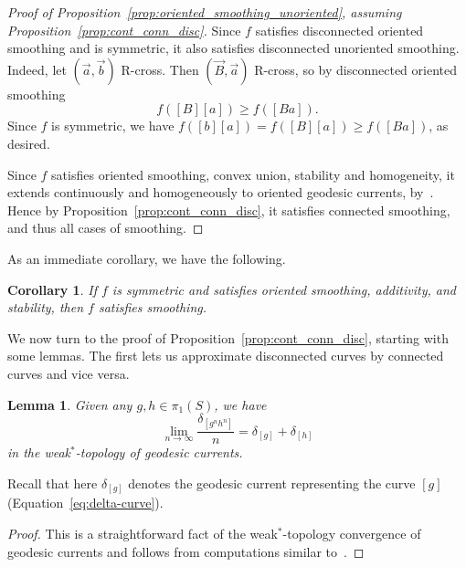 \documentclass[11pt]{amsart}
\newcommand{\ora}[1]{\overrightarrow{#1}}
\numberwithin{equation}{section}
\numberwithin{figure}{section}
\newtheorem{lemma}[theorem]{Lemma}
\newtheorem{corollary}[theorem]{Corollary}
\theoremstyle{definition}
\theoremstyle{plain}
\begin{document}
\begin{proof}[Proof of
  Proposition~\ref{prop:oriented_smoothing_unoriented}, assuming Proposition~\ref{prop:cont_conn_disc}]
  Since $f$ satisfies disconnected oriented smoothing and is
  symmetric, it also
  satisfies disconnected unoriented smoothing. Indeed, let
  $(\ora{a},\ora{b})$ R-cross. Then $(\ora{B},\ora{a})$ R-cross, so by
  disconnected oriented smoothing
\[
f([B][a]) \geq f([Ba]).
\]
Since $f$ is symmetric, we have $f([b][a])=f([B][a]) \geq
f([Ba])$, as desired.

Since $f$ satisfies oriented smoothing, convex union, stability and
homogeneity, it extends continuously and homogeneously
to oriented geodesic currents, by~\cite[Theorem~A]{MGT21:Smoothings}. Hence by
Proposition~\ref{prop:cont_conn_disc}, it satisfies connected
smoothing, and thus all cases of smoothing.
\end{proof}

As an immediate corollary, we have the following.

\begin{corollary}
If $f$ is symmetric and satisfies oriented smoothing, additivity, and
stability, then $f$ satisfies smoothing.
\label{cor:oriented_smoothing_unoriented}
\end{corollary}

We now turn to the proof of Proposition~\ref{prop:cont_conn_disc},
starting with some lemmas. The first lets us approximate
disconnected curves by connected curves and vice versa.
\begin{lemma}
  Given any $g,h \in \pi_1(S)$, we have
\[
\lim_{n\to\infty} \frac{\delta_{[g^n h^n]}}{n} = \delta_{[g]} + \delta_{[h]}
\]
in the weak$^*$-topology of geodesic currents.
\label{lem:gnhn_to_gsumh}
\end{lemma}

Recall that here $\delta_{[g]}$ denotes the geodesic current representing the curve $[g]$ (Equation~\eqref{eq:delta-curve}).

\begin{proof}
  This is a straightforward fact of the weak$^*$-topology convergence
  of geodesic currents and follows from computations similar
  to~\cite[Proposition~5.1]{Sas22:Currents}.
\end{proof}
\end{document}
